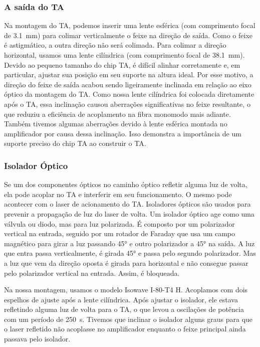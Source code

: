 \subsubsection{A saída do \gls{TA}}
Na montagem do \gls{TA}, podemos inserir uma lente esférica (com comprimento focal de \SI{3,1}{mm}) para colimar verticalmente o feixe na direção de saída. Como o feixe é astigmático, a outra direção não será colimada. Para colimar a direção horizontal, usamos uma lente cilíndrica (com comprimento focal de \SI{38,1}{mm}). Devido ao pequeno tamanho do chip TA, é difícil alinhar corretamente e, em particular, ajustar sua posição em seu suporte na altura ideal. Por esse motivo, a direção do feixe de saída acabou sendo ligeiramente inclinada em relação ao eixo óptico da montagem do \gls{TA}. Como nossa lente cilíndrica foi colocada diretamente após o \gls{TA}, essa inclinação causou aberrações significativas no feixe resultante, o que reduziu a eficiência de acoplamento na fibra monomodo mais adiante. Também tivemos algumas aberrações devido à lente esférica montada no amplificador por causa dessa inclinação. Isso demonstra a importância de um suporte preciso do chip \gls{TA} ao construir o \gls{TA}.

\subsubsection{Isolador Óptico}
Se um dos componentes ópticos no caminho óptico refletir alguma luz de volta, ela pode acoplar no \gls{TA} e interferir em seu funcionamento. O mesmo pode acontecer com o laser de acionamento do \gls{TA}. Isoladores ópticos são usados para prevenir a propagação de luz do laser de volta. Um isolador óptico age como uma válvula ou diodo, mas para luz polarizada. É composto por um polarizador vertical na entrada, seguido por um rotador de Faraday que usa um campo magnético para girar a luz passando \ang{45} e outro polarizador a \ang{45} na saída. A luz que entra passa verticalmente, é girada \ang{45} e passa pelo segundo polarizador. Mas a luz que vem da direção oposta é girada para horizontal e não consegue passar pelo polarizador vertical na entrada. Assim, é bloqueada.

Na nossa montagem, usamos o modelo Isowave I-80-T4 H. Acoplamos com dois espelhos de ajuste após a lente cilíndrica. Após ajustar o isolador, ele estava refletindo alguma luz de volta para o \gls{TA}, o que levou a oscilações de potência com um período de \SI{250}{s}. Tivemos que inclinar o isolador alguns graus para que o laser refletido não acoplasse no amplificador enquanto o feixe principal ainda passava pelo isolador.

